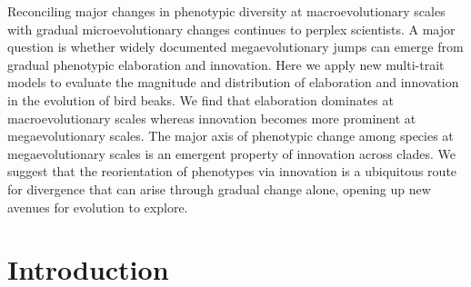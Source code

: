 \documentclass[12pt,letterpaper]{article}
\begin{document}
Reconciling major changes in phenotypic diversity at macroevolutionary scales with gradual microevolutionary changes continues to perplex scientists.
A major question is whether widely documented megaevolutionary jumps can emerge from gradual phenotypic elaboration and innovation.
Here we apply new multi-trait models to evaluate the magnitude and distribution of elaboration and innovation in the evolution of bird beaks.
We find that elaboration dominates at macroevolutionary scales whereas innovation becomes more prominent at megaevolutionary scales.
The major axis of phenotypic change among species at megaevolutionary scales is an emergent property of innovation across clades.
We suggest that the reorientation of phenotypes via innovation is a ubiquitous route for divergence that can arise through gradual change alone, opening up new avenues for evolution to explore.




\section{Introduction}

\end{document}
